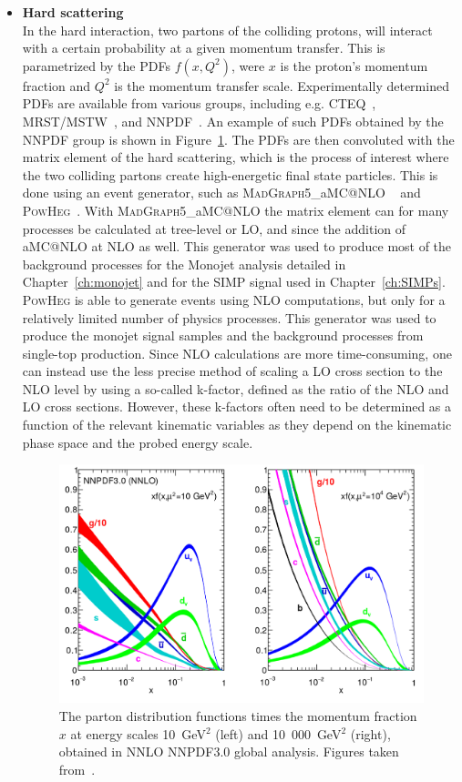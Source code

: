 \begin{itemize}
 \item[] \textbf{Hard scattering}\\
 In the hard interaction, two partons of the colliding protons, will interact with a certain probability at a given momentum transfer. This is parametrized by the \acp{PDF} $f(x, Q^2)$, were $x$ is the proton's momentum fraction and $Q^2$ is the momentum transfer scale. Experimentally determined \acp{PDF} are available from various groups, including e.g. CTEQ~\cite{Pumplin:2002vw}, MRST/MSTW~\cite{Martin:2009iq}, and NNPDF~\cite{Ball:2014uwa}. An example of such \acp{PDF} obtained by the NNPDF group is shown in Figure~\ref{fig:pdf}. The \acp{PDF} are then convoluted with the matrix element of the hard scattering, which is the process of interest where the two colliding partons create high-energetic final state particles. This is done using an event generator, such as \textsc{MadGraph5\_}a\textsc{MC@NLO} ~\cite{Alwall:2014hca} and \textsc{PowHeg}~\cite{Frixione:2007vw}. With \textsc{MadGraph5\_}a\textsc{MC@NLO} the matrix element can for many processes be calculated at tree-level or \ac{LO}, and since the addition of a\textsc{MC@NLO} at \ac{NLO} as well. This generator was used to produce most of the background processes for the Monojet analysis detailed in Chapter~\ref{ch:monojet} and for the \ac{SIMP} signal used in Chapter~\ref{ch:SIMPs}. \textsc{PowHeg} is able to generate events using \ac{NLO} computations, but only for a relatively limited number of physics processes. This generator was used to produce the monojet signal samples and the background processes from single-top production. Since \ac{NLO} calculations are more time-consuming, one can instead use the less precise method of scaling a \ac{LO} cross section to the \ac{NLO} level by using a so-called k-factor, defined as the ratio of the \ac{NLO} and \ac{LO} cross sections. However, these k-factors often need to be determined as a function of the relevant kinematic variables as they depend on the kinematic phase space and the probed energy scale.

\begin{figure}[ht]
  \centering
 \includegraphics[width=.75\textwidth]{pdf.png} 
 \caption{The parton distribution functions times the momentum fraction $x$ at energy scales 10~GeV$^2$ (left) and 10~000~GeV$^2$ (right), obtained in NNLO NNPDF3.0 global analysis. Figures taken from~\cite{Ball:2014uwa}.}
 \label{fig:pdf}
\end{figure}


\end{itemize}
